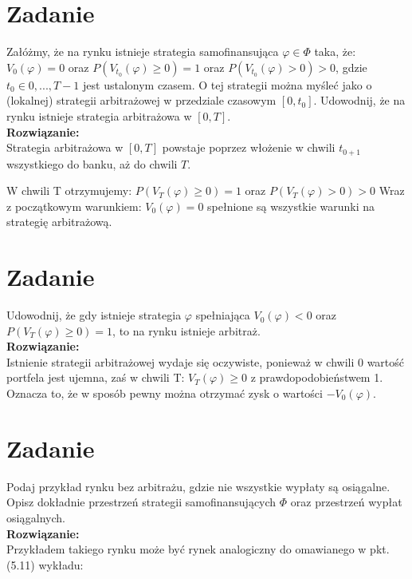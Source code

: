 \documentclass{article}
\begin{document}
\section{Zadanie}
Załóżmy, że na rynku istnieje strategia samofinansująca $\varphi \in \Phi$ taka, że: \\
$V_{0}(\varphi) = 0$ oraz $P(V_{t_{0}} (\varphi) \geq 0) = 1$ oraz $P(V_{t_{0}} (\varphi) > 0) > 0$,
gdzie $t_{0} \in {0, . . . , T - 1}$ jest ustalonym czasem. O tej strategii można myśleć jako o (lokalnej) strategii arbitrażowej w przedziale czasowym $[0, t_{0} ]$. Udowodnij, że na rynku istnieje strategia arbitrażowa w $[0, T ]$. \\

\textbf{Rozwiązanie:} \\
Strategia arbitrażowa w  $[0, T ]$ powstaje poprzez włożenie w chwili $t_{0+1}$ wszystkiego do banku, aż do chwili $T$.

W chwili T otrzymujemy:
 $P(V_{T} (\varphi) \geq 0) = 1$ oraz $P(V_{T} (\varphi) > 0) > 0$
Wraz z początkowym warunkiem: $V_{0}(\varphi) = 0$ spełnione są wszystkie warunki na strategię arbitrażową.


\section{Zadanie}

Udowodnij, że gdy istnieje strategia $\varphi$ spełniająca $V_{0} (\varphi) < 0$ oraz \\ $P(V_{T} (\varphi) \geq 0) = 1$, to na rynku istnieje arbitraż. \\

\textbf{Rozwiązanie:} \\
Istnienie strategii arbitrażowej wydaje się oczywiste, ponieważ w chwili 0 wartość portfela jest ujemna, zaś w chwili T: $V_{T}(\varphi) \geq 0$ z prawdopodobieństwem 1. Oznacza to, że w sposób pewny można otrzymać zysk o wartości $-V_{0}(\varphi)$.

\section{Zadanie}

Podaj przykład rynku bez arbitrażu, gdzie nie wszystkie wypłaty są osiągalne. Opisz dokładnie przestrzeń strategii samofinansujących $\Phi$ oraz przestrzeń wypłat osiągalnych. \\

\textbf{Rozwiązanie:} \\
Przykładem takiego rynku może być rynek analogiczny do omawianego w pkt. (5.11) wykładu: \\
\end{document}
